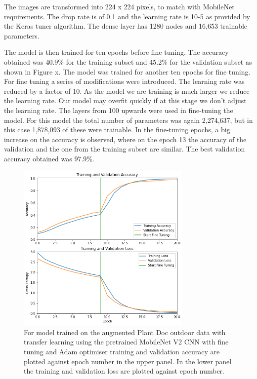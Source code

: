 \documentclass[conference]{IEEEtran}
\begin{document}
The images are transformed into 224 x 224 pixels, to match with MobileNet requirements. The drop rate is of 0.1 and the learning rate is 10-5 as provided by the Keras tuner algorithm. The dense layer has 1280 nodes and 16,653 trainable parameters. 

The model is then trained for ten epochs before fine tuning. The accuracy obtained was 40.9\% for the training subset and 45.2\% for the validation subset as shown in Figure x. The model was trained for another ten epochs for fine tuning. For fine tuning a series of modifications were introduced. The learning rate was reduced by a factor of 10. As the model we are training is much larger we reduce the learning rate. Our model may overfit quickly if at this stage we don’t adjust the learning rate. The layers from 100 upwards were used in fine-tuning the model. For this model the total number of parameters was again 2,274,637, but in this case 1,878,093 of these were trainable. In the fine-tuning epochs, a big increase on the accuracy is observed, where on the epoch 13 the accuracy of the validation and the one from the training subset are similar. The best validation accuracy obtained was 97.9\%.
\begin{figure}[htbp]
\centerline{\includegraphics[width=8.5cm]{ModelOutdoorsMobileNetEpochsAccuracychart.png}}
\caption{For model trained on the augmented Plant Doc outdoor data with transfer learning using the pretrained MobileNet V2 CNN with fine tuning and Adam optimiser training and validation accuracy are plotted against epoch number in the upper panel. In the lower panel the training and validation loss are plotted against epoch number.}
\label{fig}
\end{figure}

\end{document}
